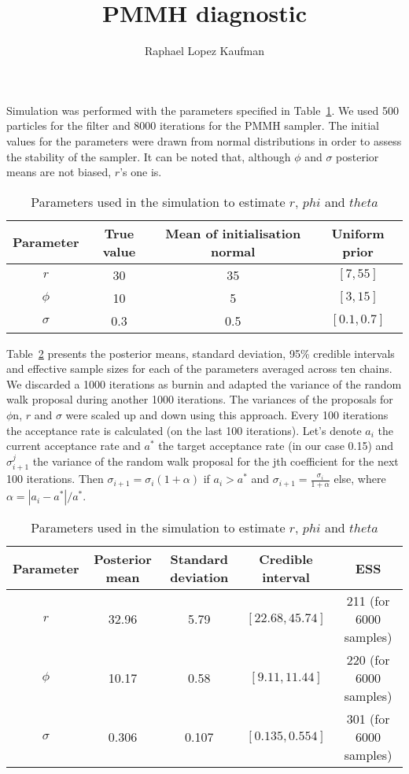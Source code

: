 \documentclass{article}
\title{PMMH diagnostic}
\author{Raphael Lopez Kaufman}
\date{}
\begin{document}
Simulation was performed with the parameters specified in Table~\ref{table:simul}. We used 500 particles for the filter and 8000 iterations for the PMMH sampler. The initial values for the parameters were drawn from normal distributions in order to assess the stability of the sampler. It can be noted that, although $\phi$ and $\sigma$ posterior means are not biased, $r$'s one is. 

	\begin{table}[htb]
		\centering
		\vspace{5mm}
		\begin{tabular}{c|c|c|c}
			Parameter & True value &  Mean of initialisation normal &  Uniform prior \\ \hline
			$r$ & 30 & 35 & $[7, 55]$\\ \hline
			$\phi$ & 10 & 5 & $[3, 15]$\\ \hline
			$\sigma$ & 0.3 &  0.5 & $[0.1, 0.7]$\\ \hline
		\end{tabular}
		\caption{Parameters used in the simulation to estimate $r$, $phi$ and $theta$}
		\label{table:simul}
		\vspace{5mm}
	\end{table}

Table~\ref{table:summary} presents the posterior means, standard deviation, 95\% credible intervals and effective sample sizes for each of the parameters averaged across ten chains. We discarded a 1000 iterations as burnin and adapted the variance of the random walk proposal during another 1000 iterations. The variances of the proposals for $\phi$n, $r$ and $\sigma$ were scaled up and down using this approach. Every 100 iterations the acceptance rate is calculated (on the last 100 iterations). Let's denote $a_{i}$ the current acceptance rate and $a^*$ the target acceptance rate (in our case 0.15) and $\sigma_{i+1}^j$ the variance of the random walk proposal for the jth coefficient for the next 100 iterations. Then $\sigma_{i+1} = \sigma_i(1+\alpha)$ if $a_{i} > a^*$ and $\sigma_{i+1} = \frac{\sigma_i}{1+\alpha}$ else,  where $\alpha = |a_{i}-a^*|/a^*$. 

	\begin{table}[htb]
		\centering
		\vspace{5mm}
		\begin{tabular}{c|c|c|c|c}
			Parameter & Posterior mean & Standard deviation& Credible interval &  ESS \\ \hline
			$r$ & 32.96 & 5.79 & $[22.68, 45.74]$ & 211 (for 6000 samples)\\ \hline
			$\phi$ & 10.17 & 0.58 & $[9.11, 11.44]$ & 220 (for 6000 samples)\\ \hline
			$\sigma$ & 0.306 &  0.107 & $[0.135, 0.554]$& 301 (for 6000 samples) \\ \hline
		\end{tabular}
		\caption{Parameters used in the simulation to estimate $r$, $phi$ and $theta$}
		\label{table:summary}
		\vspace{5mm}
	\end{table}
\end{document}
